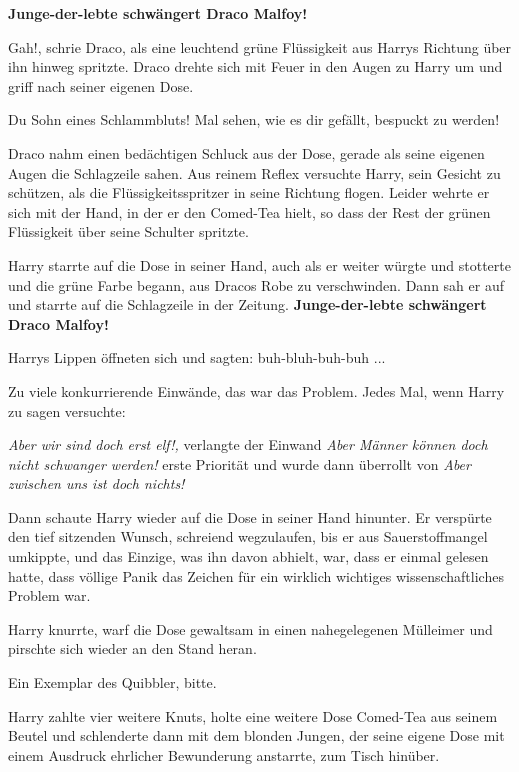 \textbf{\glqq{}Junge-der-lebte schwängert Draco Malfoy!\grqq{}}

\glqq{}Gah!\grqq{}, schrie Draco, als eine leuchtend grüne Flüssigkeit aus
Harrys Richtung über ihn hinweg spritzte. Draco drehte sich mit Feuer in den
Augen zu Harry um und griff nach seiner eigenen Dose.

\glqq{}Du Sohn eines Schlammbluts! Mal sehen, wie es dir gefällt, bespuckt zu
werden!\grqq{}

Draco nahm einen bedächtigen Schluck aus der Dose, gerade als seine eigenen
Augen die Schlagzeile sahen. Aus reinem Reflex versuchte Harry, sein Gesicht zu
schützen, als die Flüssigkeitsspritzer in seine Richtung flogen. Leider wehrte
er sich mit der Hand, in der er den Comed-Tea hielt, so dass der Rest der grünen
Flüssigkeit über seine Schulter spritzte.

Harry starrte auf die Dose in seiner Hand, auch als er weiter würgte und
stotterte und die grüne Farbe begann, aus Dracos Robe zu verschwinden. Dann sah
er auf und starrte auf die Schlagzeile in der Zeitung.
\textbf{\glqq{}Junge-der-lebte schwängert Draco Malfoy!\grqq{}}

Harrys Lippen öffneten sich und sagten: \glqq{}buh-bluh-buh-buh ...\grqq{}

Zu viele konkurrierende Einwände, das war das Problem. Jedes Mal, wenn Harry zu
sagen versuchte:

\emph{\glqq{}Aber wir sind doch erst elf!\grqq{},} verlangte der Einwand
\emph{\glqq{}Aber Männer können doch nicht schwanger werden!\grqq{}} erste
Priorität und wurde dann überrollt von \emph{\glqq{}Aber zwischen uns ist doch
nichts!\grqq{}}

Dann schaute Harry wieder auf die Dose in seiner Hand hinunter. Er verspürte den
tief sitzenden Wunsch, schreiend wegzulaufen, bis er aus Sauerstoffmangel
umkippte, und das Einzige, was ihn davon abhielt, war, dass er einmal gelesen
hatte, dass völlige Panik das Zeichen für ein wirklich wichtiges
wissenschaftliches Problem war.

Harry knurrte, warf die Dose gewaltsam in einen nahegelegenen Mülleimer und
pirschte sich wieder an den Stand heran.

\glqq{}Ein Exemplar des Quibbler, bitte.\grqq{}

Harry zahlte vier weitere Knuts, holte eine weitere Dose Comed-Tea aus seinem
Beutel und schlenderte dann mit dem blonden Jungen, der seine eigene Dose mit
einem Ausdruck ehrlicher Bewunderung anstarrte, zum Tisch hinüber.

